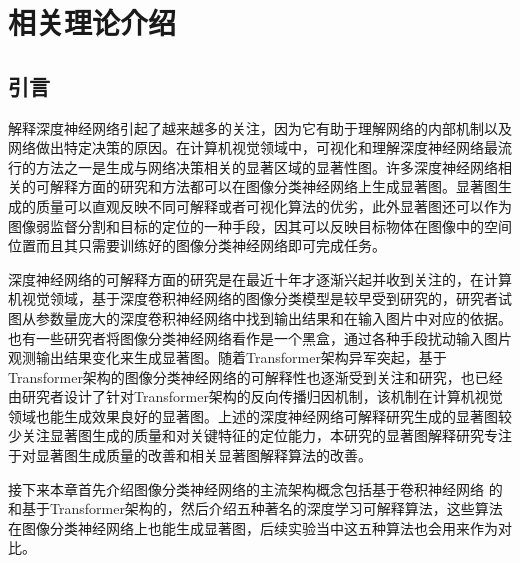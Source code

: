 


\chapter{相关理论介绍
}\label{relatedWork}
\thispagestyle{others}
\pagestyle{others}
\xiaosi

\section{引言}
解释深度神经网络引起了越来越多的关注，因为它有助于理解网络的内部机制以及网络做出特定决策的原因。在计算机视觉领域中，可视化和理解深度神经网络最流行的方法之一是生成与网络决策相关的显著区域的显著性图。许多深度神经网络相关的可解释方面的研究和方法都可以在图像分类神经网络上生成显著图。显著图生成的质量可以直观反映不同可解释或者可视化算法的优劣，此外显著图还可以作为图像弱监督分割和目标的定位的一种手段，因其可以反映目标物体在图像中的空间位置而且其只需要训练好的图像分类神经网络即可完成任务。


深度神经网络的可解释方面的研究是在最近十年才逐渐兴起并收到关注的，在计算机视觉领域，基于深度卷积神经网络的图像分类模型是较早受到研究的，研究者试图从参数量庞大的深度卷积神经网络中找到输出结果和在输入图片中对应的依据。也有一些研究者将图像分类神经网络看作是一个黑盒，通过各种手段扰动输入图片观测输出结果变化来生成显著图。随着Transformer架构异军突起，基于Transformer架构的图像分类神经网络的可解释性也逐渐受到关注和研究，也已经由研究者设计了针对Transformer架构的反向传播归因机制，该机制在计算机视觉领域也能生成效果良好的显著图。上述的深度神经网络可解释研究生成的显著图较少关注显著图生成的质量和对关键特征的定位能力，本研究的显著图解释研究专注于对显著图生成质量的改善和相关显著图解释算法的改善。

接下来本章首先介绍图像分类神经网络的主流架构概念包括基于卷积神经网络 的和基于Transformer架构的，然后介绍五种著名的深度学习可解释算法，这些算法在图像分类神经网络上也能生成显著图，后续实验当中这五种算法也会用来作为对比。

